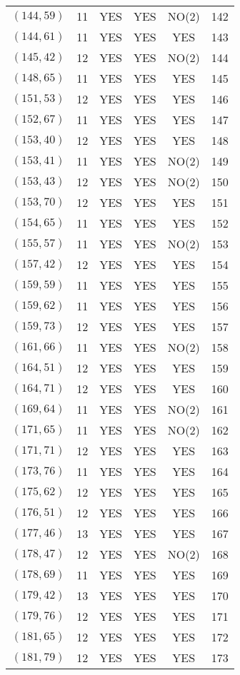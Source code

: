 \begin{longtable}{|c|c|c|c|c|c|}
$(144, 59)$ & 11 & YES & YES & NO(2) & 142\\
$(144, 61)$ & 11 & YES & YES & YES & 143\\
$(145, 42)$ & 12 & YES & YES & NO(2) & 144\\
$(148, 65)$ & 11 & YES & YES & YES & 145\\
$(151, 53)$ & 12 & YES & YES & YES & 146\\
$(152, 67)$ & 11 & YES & YES & YES & 147\\
$(153, 40)$ & 12 & YES & YES & YES & 148\\
$(153, 41)$ & 11 & YES & YES & NO(2) & 149\\
$(153, 43)$ & 12 & YES & YES & NO(2) & 150\\
$(153, 70)$ & 12 & YES & YES & YES & 151\\
$(154, 65)$ & 11 & YES & YES & YES & 152\\
$(155, 57)$ & 11 & YES & YES & NO(2) & 153\\
$(157, 42)$ & 12 & YES & YES & YES & 154\\
$(159, 59)$ & 11 & YES & YES & YES & 155\\
$(159, 62)$ & 11 & YES & YES & YES & 156\\
$(159, 73)$ & 12 & YES & YES & YES & 157\\
$(161, 66)$ & 11 & YES & YES & NO(2) & 158\\
$(164, 51)$ & 12 & YES & YES & YES & 159\\
$(164, 71)$ & 12 & YES & YES & YES & 160\\
$(169, 64)$ & 11 & YES & YES & NO(2) & 161\\
$(171, 65)$ & 11 & YES & YES & NO(2) & 162\\
$(171, 71)$ & 12 & YES & YES & YES & 163\\
$(173, 76)$ & 11 & YES & YES & YES & 164\\
$(175, 62)$ & 12 & YES & YES & YES & 165\\
$(176, 51)$ & 12 & YES & YES & YES & 166\\
$(177, 46)$ & 13 & YES & YES & YES & 167\\
$(178, 47)$ & 12 & YES & YES & NO(2) & 168\\
$(178, 69)$ & 11 & YES & YES & YES & 169\\
$(179, 42)$ & 13 & YES & YES & YES & 170\\
$(179, 76)$ & 12 & YES & YES & YES & 171\\
$(181, 65)$ & 12 & YES & YES & YES & 172\\
$(181, 79)$ & 12 & YES & YES & YES & 173\\

\end{longtable}
